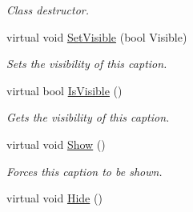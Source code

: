 \begin{DoxyCompactItemize}
\begin{DoxyCompactList}\small\item\em Class destructor. \item\end{DoxyCompactList}\item 
virtual void \hyperlink{classphys_1_1UI_1_1Caption_afce46e42eb3ab522c29d5c13a5691065}{SetVisible} (bool Visible)
\begin{DoxyCompactList}\small\item\em Sets the visibility of this caption. \item\end{DoxyCompactList}\item 
virtual bool \hyperlink{classphys_1_1UI_1_1Caption_a965d162160c26a2f9a2a16b88aa8f05d}{IsVisible} ()
\begin{DoxyCompactList}\small\item\em Gets the visibility of this caption. \item\end{DoxyCompactList}\item 
\hypertarget{classphys_1_1UI_1_1Caption_a9801eaaadf70f7373b410995b255936e}{
virtual void \hyperlink{classphys_1_1UI_1_1Caption_a9801eaaadf70f7373b410995b255936e}{Show} ()}
\label{classphys_1_1UI_1_1Caption_a9801eaaadf70f7373b410995b255936e}

\begin{DoxyCompactList}\small\item\em Forces this caption to be shown. \item\end{DoxyCompactList}\item 
\hypertarget{classphys_1_1UI_1_1Caption_a12e772b19e723334747fcf2ca009965c}{
virtual void \hyperlink{classphys_1_1UI_1_1Caption_a12e772b19e723334747fcf2ca009965c}{Hide} ()}
\label{classphys_1_1UI_1_1Caption_a12e772b19e723334747fcf2ca009965c}


\end{DoxyCompactItemize}
